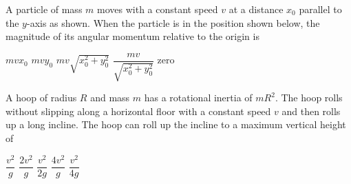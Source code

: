 \documentclass{../../oss-apphys-exam}
\begin{document}



\raggedcolumns
\begin{multicols*}{2}
  \begin{questions}
    \question A particle of mass $m$ moves with a constant speed $v$ at a
    distance $x_0$ parallel to the $y$-axis as shown. When the particle is in
    the position shown below, the magnitude of its angular momentum relative to
    the origin is
    \begin{center}
    \end{center}
    \begin{choices}
      \choice $mvx_0$
      \choice $mvy_0$
      \choice $mv\sqrt{x_0^2+y_0^2}$
      \choice $\dfrac{mv}{\sqrt{x_0^2+y_0^2}}$
      \choice zero
    \end{choices}
    
    \question A hoop of radius $R$ and mass $m$ has a rotational inertia of
    $mR^2$. The hoop rolls without slipping along a horizontal floor with a
    constant speed $v$ and then rolls up a long incline. The hoop can roll
    up the incline to a maximum vertical height of
    \begin{center}
    \end{center}
    \begin{choices}
      \choice$\dfrac{v^2}g$
      \choice$\dfrac{2v^2}{g}$
      \choice$\dfrac{v^2}{2g}$
      \choice$\dfrac{4v^2}{g}$
      \choice$\dfrac{v^2}{4g}$
    \end{choices}
    \columnbreak
    

\end{questions}
\end{multicols*}
\end{document}
